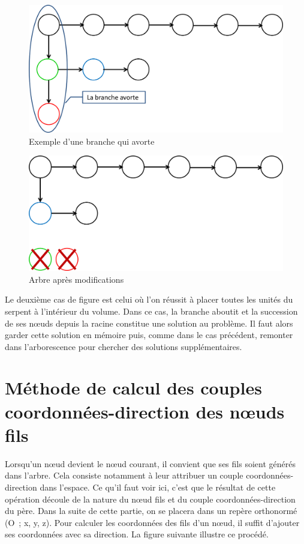 \begin{figure}[h]
 \centering
 \includegraphics[scale=0.3,keepaspectratio=true]{img/pathAbort.png}
 \caption{Exemple d'une branche qui avorte}
 \label{pathAbort}
\end{figure}

\newpage

\begin{figure}[h]
 \centering
 \includegraphics[scale=0.3,keepaspectratio=true]{img/pathAfter.png}
 \caption{Arbre après modifications}
 \label{pathAfter}
\end{figure}

Le deuxième cas de figure est celui où l’on réussit à placer toutes les unités du serpent à l’intérieur du volume. Dans ce cas, la branche aboutit et la succession de ses nœuds depuis la racine constitue une solution au problème. Il faut alors garder cette solution en mémoire puis, comme dans le cas précédent, remonter dans l’arborescence pour chercher des solutions supplémentaires.

\section{Méthode de calcul des couples coordonnées-direction des nœuds fils}
Lorsqu’un nœud devient le nœud courant, il convient que ses fils soient générés dans l’arbre. Cela consiste notamment à leur attribuer un couple coordonnées-direction dans l’espace. Ce qu’il faut voir ici, c’est que le résultat de cette opération découle de la nature du nœud fils et du couple coordonnées-direction du père. Dans la suite de cette partie, on se placera dans un repère orthonormé (O ; x, y, z).
Pour calculer les coordonnées des fils d’un nœud, il suffit d’ajouter ses coordonnées avec sa direction. La figure suivante illustre ce procédé.

